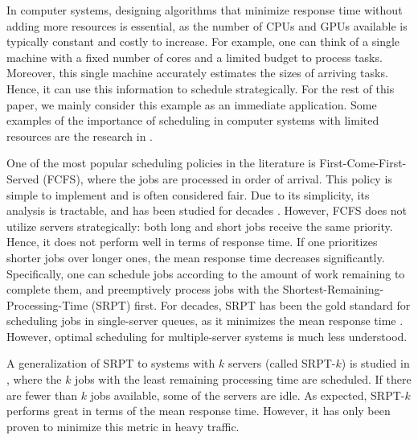 \documentclass[acmsmall]{acmart}
\begin{document}
In computer systems, designing algorithms that minimize response time without adding more resources is essential, as the number of CPUs and GPUs available is typically constant and costly to increase. For example, one can think of a single machine with a fixed number of cores and a limited budget to process tasks. Moreover, this single machine accurately estimates the sizes of arriving tasks. Hence, it can use this information to schedule strategically. For the rest of this paper, we mainly consider this example as an immediate application. Some examples of the importance of scheduling in computer systems with limited resources are the research in \cite{Kul-Ful2011-example-scheduling,Zhu-et-al2012-example-scheduling}.

One of the most popular scheduling policies in the literature is First-Come-First-Served (FCFS), where the jobs are processed in order of arrival. This policy is simple to implement and is often considered fair. Due to its simplicity, its analysis is tractable, and has been studied for decades \cite{loulou1973multi,kollerstrom1974heavy-1,kollerstrom1979heavy-ii,grosof-et-al2022wcfs}. However, FCFS does not utilize servers strategically: both long and short jobs receive the same priority. Hence, it does not perform well in terms of response time. If one prioritizes shorter jobs over longer ones, the mean response time decreases significantly. Specifically, one can schedule jobs according to the amount of work remaining to complete them, and preemptively process jobs with the Shortest-Remaining-Processing-Time (SRPT) first. For decades, SRPT has been the gold standard for scheduling jobs in single-server queues, as it minimizes the mean response time \cite{schrage1968proof-srpt-opt}. However, optimal scheduling for multiple-server systems is much less understood.

A generalization of SRPT to systems with $k$ servers (called SRPT-$k$) is studied in \cite{grosof-etal-2019-srpt-k}, where the $k$ jobs with the least remaining processing time are scheduled. If there are fewer than $k$ jobs available, some of the servers are idle. As expected, SRPT-$k$ performs great in terms of the mean response time. However, it has only been proven to minimize this metric in heavy traffic.
\end{document}
